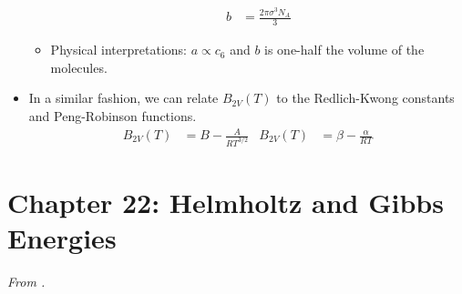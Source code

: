 \documentclass[../notes.tex]{subfiles}
\begin{document}
\begin{itemize}
\begin{itemize}
\begin{align*}
            b &= \frac{2\pi\sigma^3N_A}{3}
        \end{align*}
        \item Physical interpretations: $a\propto c_6$ and $b$ is one-half the volume of the molecules.
    \end{itemize}
    \item In a similar fashion, we can relate $B_{2V}(T)$ to the Redlich-Kwong constants and Peng-Robinson functions.
    \begin{align*}
        B_{2V}(T) &= B-\frac{A}{RT^{3/2}}&
        B_{2V}(T) &= \beta-\frac{\alpha}{RT}
    \end{align*}
\end{itemize}



\section{Chapter 22: Helmholtz and Gibbs Energies}
\emph{From \textcite{bib:McQuarrieSimon}.}
\end{document}
